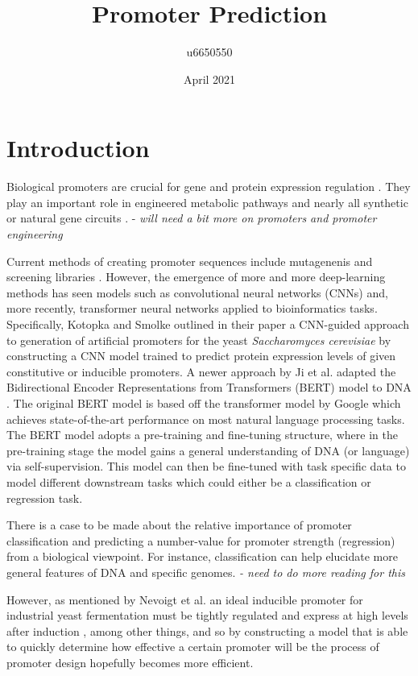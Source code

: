 \documentclass{article}
\title{Promoter Prediction}
\author{u6650550 }
\date{April 2021}
\begin{document}
\maketitle
\section{Introduction}
Biological promoters are crucial for gene and protein expression regulation \cite{smolke2020promoter}. They play an important role in engineered metabolic pathways and nearly all synthetic or natural gene circuits \cite{smolke2020promoter, Redden2015}. - \textit{will need a bit more on promoters and promoter engineering}

Current methods of creating promoter sequences include mutagenenis \cite{Alper12678} and screening libraries \cite{Redden2015}. However, the emergence of more and more deep-learning methods  has seen models such as convolutional neural networks (CNNs) \cite{smolke2020promoter} and, more recently, transformer neural networks \cite{dnabert2020} applied to bioinformatics tasks. Specifically, Kotopka and Smolke \cite{smolke2020promoter} outlined in their paper a CNN-guided approach to generation of artificial promoters for the yeast \textit{Saccharomyces cerevisiae} by constructing a CNN model trained to predict protein expression levels of given constitutive or inducible promoters. A newer approach by Ji et al. adapted the Bidirectional Encoder Representations from Transformers (BERT) model to DNA \cite{dnabert2020}. The original BERT model is based off the transformer model by Google \cite{vaswani2017attention} which achieves state-of-the-art performance on most natural language processing tasks. The BERT model adopts a pre-training and fine-tuning structure, where in the pre-training stage the model gains a general understanding of DNA (or language) via self-supervision. This model can then be fine-tuned with task specific data to model different downstream tasks which could either be a classification or regression task.

There is a case to be made about the relative importance of promoter classification and predicting a number-value for promoter strength (regression) from a biological viewpoint. For instance, classification can help elucidate more general features of DNA and specific genomes. \textit{- need to do more reading for this}

However, as mentioned by Nevoigt et al. an ideal inducible promoter for industrial yeast fermentation must be tightly regulated and express at high levels after induction \cite{nevoight2007promoter}, among other things, and so by constructing a model that is able to quickly determine how effective a certain promoter will be the process of promoter design hopefully becomes more efficient.
\end{document}
